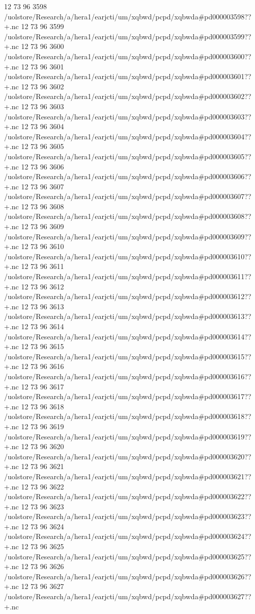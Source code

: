 12 73 96
3598
/uolstore/Research/a/hera1/earjcti/um/xqbwd/pcpd/xqbwda#pd000003598??+.nc
12 73 96
3599
/uolstore/Research/a/hera1/earjcti/um/xqbwd/pcpd/xqbwda#pd000003599??+.nc
12 73 96
3600
/uolstore/Research/a/hera1/earjcti/um/xqbwd/pcpd/xqbwda#pd000003600??+.nc
12 73 96
3601
/uolstore/Research/a/hera1/earjcti/um/xqbwd/pcpd/xqbwda#pd000003601??+.nc
12 73 96
3602
/uolstore/Research/a/hera1/earjcti/um/xqbwd/pcpd/xqbwda#pd000003602??+.nc
12 73 96
3603
/uolstore/Research/a/hera1/earjcti/um/xqbwd/pcpd/xqbwda#pd000003603??+.nc
12 73 96
3604
/uolstore/Research/a/hera1/earjcti/um/xqbwd/pcpd/xqbwda#pd000003604??+.nc
12 73 96
3605
/uolstore/Research/a/hera1/earjcti/um/xqbwd/pcpd/xqbwda#pd000003605??+.nc
12 73 96
3606
/uolstore/Research/a/hera1/earjcti/um/xqbwd/pcpd/xqbwda#pd000003606??+.nc
12 73 96
3607
/uolstore/Research/a/hera1/earjcti/um/xqbwd/pcpd/xqbwda#pd000003607??+.nc
12 73 96
3608
/uolstore/Research/a/hera1/earjcti/um/xqbwd/pcpd/xqbwda#pd000003608??+.nc
12 73 96
3609
/uolstore/Research/a/hera1/earjcti/um/xqbwd/pcpd/xqbwda#pd000003609??+.nc
12 73 96
3610
/uolstore/Research/a/hera1/earjcti/um/xqbwd/pcpd/xqbwda#pd000003610??+.nc
12 73 96
3611
/uolstore/Research/a/hera1/earjcti/um/xqbwd/pcpd/xqbwda#pd000003611??+.nc
12 73 96
3612
/uolstore/Research/a/hera1/earjcti/um/xqbwd/pcpd/xqbwda#pd000003612??+.nc
12 73 96
3613
/uolstore/Research/a/hera1/earjcti/um/xqbwd/pcpd/xqbwda#pd000003613??+.nc
12 73 96
3614
/uolstore/Research/a/hera1/earjcti/um/xqbwd/pcpd/xqbwda#pd000003614??+.nc
12 73 96
3615
/uolstore/Research/a/hera1/earjcti/um/xqbwd/pcpd/xqbwda#pd000003615??+.nc
12 73 96
3616
/uolstore/Research/a/hera1/earjcti/um/xqbwd/pcpd/xqbwda#pd000003616??+.nc
12 73 96
3617
/uolstore/Research/a/hera1/earjcti/um/xqbwd/pcpd/xqbwda#pd000003617??+.nc
12 73 96
3618
/uolstore/Research/a/hera1/earjcti/um/xqbwd/pcpd/xqbwda#pd000003618??+.nc
12 73 96
3619
/uolstore/Research/a/hera1/earjcti/um/xqbwd/pcpd/xqbwda#pd000003619??+.nc
12 73 96
3620
/uolstore/Research/a/hera1/earjcti/um/xqbwd/pcpd/xqbwda#pd000003620??+.nc
12 73 96
3621
/uolstore/Research/a/hera1/earjcti/um/xqbwd/pcpd/xqbwda#pd000003621??+.nc
12 73 96
3622
/uolstore/Research/a/hera1/earjcti/um/xqbwd/pcpd/xqbwda#pd000003622??+.nc
12 73 96
3623
/uolstore/Research/a/hera1/earjcti/um/xqbwd/pcpd/xqbwda#pd000003623??+.nc
12 73 96
3624
/uolstore/Research/a/hera1/earjcti/um/xqbwd/pcpd/xqbwda#pd000003624??+.nc
12 73 96
3625
/uolstore/Research/a/hera1/earjcti/um/xqbwd/pcpd/xqbwda#pd000003625??+.nc
12 73 96
3626
/uolstore/Research/a/hera1/earjcti/um/xqbwd/pcpd/xqbwda#pd000003626??+.nc
12 73 96
3627
/uolstore/Research/a/hera1/earjcti/um/xqbwd/pcpd/xqbwda#pd000003627??+.nc
